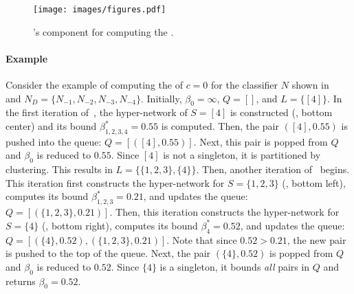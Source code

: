  \begin{figure*}[t]
    \centering
  \texttt{[image: images/figures.pdf]}
    \caption{ \tool's component for computing the \propa.}
    \label{fig::system_description}
\end{figure*}
\paragraph{Example}
Consider the example of computing the \propa of $c=0$ for the classifier $N$ shown in~ and $N_D=\{N_{-1},N_{-2},N_{-3},N_{-4}\}$. Initially, $\beta_0=\infty$, $Q=[]$, and $L=\{[4]\}$.
In the first iteration of~, the hyper-network of $S=[4]$ is constructed (, bottom center) 
and its bound $\beta^*_{1,2,3,4}=0.55$ is computed. Then, the pair $([4],0.55)$ is pushed into the queue: $Q=[([4],0.55)]$. 
Next, this pair is popped from $Q$ and $\beta_0$ is reduced to $0.55$. Since $[4]$ is not a singleton, it is partitioned by clustering. This results in $L=\{\{1,2,3\},\{4\}\}$. Then, another iteration of~ begins. This iteration first constructs the hyper-network for $S=\{1,2,3\}$ (, bottom left), computes its bound $\beta^*_{1,2,3}=0.21$, and updates the queue: $Q=[(\{1,2,3\},0.21)]$. Then, this iteration constructs the hyper-network for $S=\{4\}$ (, bottom right), computes its bound $\beta^*_{4}=0.52$, and updates the queue: $Q=[(\{4\},0.52),(\{1,2,3\},0.21)]$.
Note that since $0.52>0.21$, the new pair is pushed to the top of the queue. Next, the pair $(\{4\},0.52)$ is popped from $Q$
and $\beta_0$ is reduced to $0.52$. Since $\{4\}$ is a singleton, it bounds \emph{all} pairs in $Q$ and  returns $\beta_0=0.52$. 



